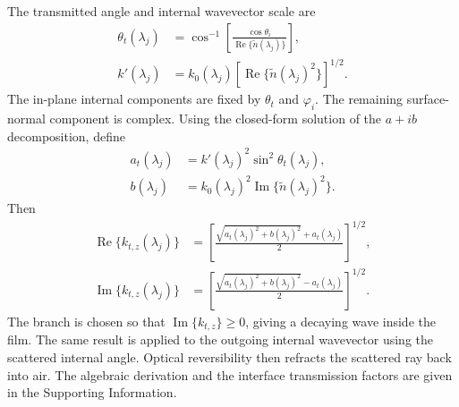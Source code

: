 The transmitted angle and internal wavevector scale are
\begin{align}
  \theta_t(\lambda_j)
  &=
  \cos^{-1}\!\left[
  \frac{\cos\theta_i}{\operatorname{Re}\{\tilde n(\lambda_j)\}}
  \right],\\
  k'(\lambda_j)
  &=
  k_0(\lambda_j)
  \left[\operatorname{Re}\{\tilde n(\lambda_j)^2\}\right]^{1/2}.
  \label{eq:theta_kprime_lambda_main}
\end{align}
The in-plane internal components are fixed by \(\theta_t\) and \(\varphi_i\).
The remaining surface-normal component is complex. Using the closed-form
solution of the \(a+i b\) decomposition, define
\begin{align}
  a_t(\lambda_j)
  &=
  k'(\lambda_j)^2\sin^2\theta_t(\lambda_j),\\
  b(\lambda_j)
  &=
  k_0(\lambda_j)^2
  \operatorname{Im}\{\tilde n(\lambda_j)^2\}.
  \label{eq:at_b_lambda_main}
\end{align}
Then
\begin{align}
  \operatorname{Re}\{k_{t,z}(\lambda_j)\}
  &=
  \left[
  \frac{\sqrt{a_t(\lambda_j)^2+b(\lambda_j)^2}+a_t(\lambda_j)}{2}
  \right]^{1/2},\\
  \operatorname{Im}\{k_{t,z}(\lambda_j)\}
  &=
  \left[
  \frac{\sqrt{a_t(\lambda_j)^2+b(\lambda_j)^2}-a_t(\lambda_j)}{2}
  \right]^{1/2}.
  \label{eq:ktz_solution_lambda_main}
\end{align}
The branch is chosen so that \(\operatorname{Im}\{k_{t,z}\}\ge 0\), giving a
decaying wave inside the film. The same result is applied to the outgoing
internal wavevector using the scattered internal angle. Optical reversibility
then refracts the scattered ray back into air. The algebraic derivation and the
interface transmission factors are given in the Supporting Information.

